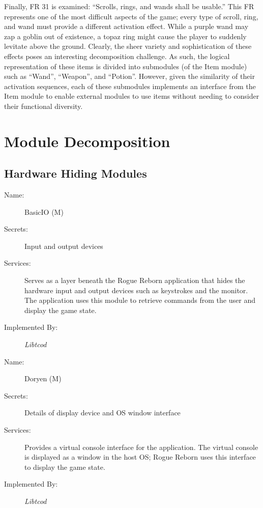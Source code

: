 \documentclass[12pt, titlepage]{article}
\newcommand{\newSection}[1]{
  \newpage
  \section{#1}
}
\newcounter{mnum}
\newcommand{\mdprint}[1]{\addtocounter{mnum}{1} #1 (M\themnum)}
\begin{document}
    Finally, FR 31 is examined: ``Scrolls, rings, and wands shall be usable.''  This FR represents one of the most difficult aspects of the game; every type of scroll, ring, and wand must provide a different activation effect.  While a purple wand may zap a goblin out of existence, a topaz ring might cause the player to suddenly levitate above the ground.  Clearly, the sheer variety and sophistication of these effects poses an interesting decomposition challenge.  As such, the logical representation of these items is divided into submodules (of the Item module) such as ``Wand'', ``Weapon'', and ``Potion''.  However, given the similarity of their activation sequences, each of these submodules implements an interface from the Item module to enable external modules to use items without needing to consider their functional diversity.


\newSection{Module Decomposition} \label{SecMD}

    \subsection{Hardware Hiding Modules}

        \bigskip\begin{description}
            \item[Name:] \mdprint{BasicIO}
            \item[Secrets:]Input and output devices
            \item[Services:]Serves as a layer beneath the Rogue Reborn application that hides the hardware input and output devices such as keystrokes and the monitor.  The application uses this module to retrieve commands from the user and display the game state.
            \item[Implemented By:]\it Libtcod
        \end{description}

        \bigskip\begin{description}
            \item[Name:]\mdprint{Doryen}
            \item[Secrets:]Details of display device and OS window interface
            \item[Services:]Provides a virtual console interface for the application.  The virtual console is displayed as a window in the host OS; Rogue Reborn uses this interface to display the game state.
            \item[Implemented By:]\it Libtcod
        \end{description}
\end{document}
